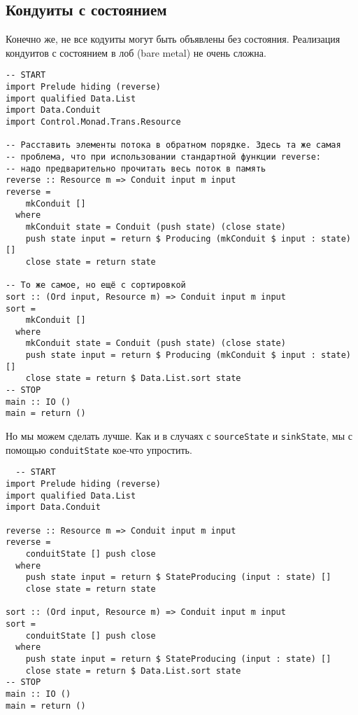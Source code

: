 \subsection{Кондуиты с состоянием}
Конечно же, не все кодуиты могут быть объявлены без состояния.  Реализация 
кондуитов с состоянием в лоб (bare metal) не очень сложна.
\begin{lstlisting}
-- START
import Prelude hiding (reverse)
import qualified Data.List
import Data.Conduit
import Control.Monad.Trans.Resource

-- Расставить элементы потока в обратном порядке. Здесь та же самая
-- проблема, что при использовании стандартной функции reverse:
-- надо предварительно прочитать весь поток в память
reverse :: Resource m => Conduit input m input
reverse =
    mkConduit []
  where
    mkConduit state = Conduit (push state) (close state)
    push state input = return $ Producing (mkConduit $ input : state) []
    close state = return state

-- То же самое, но ещё с сортировкой
sort :: (Ord input, Resource m) => Conduit input m input
sort =
    mkConduit []
  where
    mkConduit state = Conduit (push state) (close state)
    push state input = return $ Producing (mkConduit $ input : state) []
    close state = return $ Data.List.sort state
-- STOP
main :: IO ()
main = return ()
\end{lstlisting} 
Но мы можем сделать лучше. Как и в случаях с \lstinline'sourceState' и 
\lstinline'sinkState', мы с помощью \lstinline'conduitState' кое-что упростить.
\begin{lstlisting}
  -- START
import Prelude hiding (reverse)
import qualified Data.List
import Data.Conduit

reverse :: Resource m => Conduit input m input
reverse =
    conduitState [] push close
  where
    push state input = return $ StateProducing (input : state) []
    close state = return state

sort :: (Ord input, Resource m) => Conduit input m input
sort =
    conduitState [] push close
  where
    push state input = return $ StateProducing (input : state) []
    close state = return $ Data.List.sort state
-- STOP
main :: IO ()
main = return ()
\end{lstlisting}

